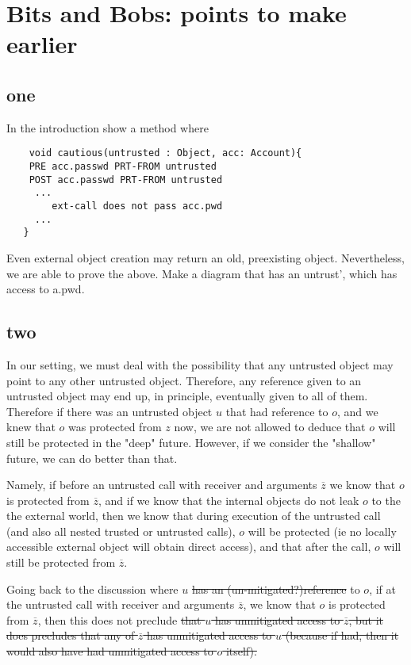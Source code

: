 

\section{Bits and Bobs: points to make earlier}

\subsection{one}
In the introduction show a method where
\begin{lstlisting}
    void cautious(untrusted : Object, acc: Account){
    PRE acc.passwd PRT-FROM untrusted
    POST acc.passwd PRT-FROM untrusted
     ...
        ext-call does not pass acc.pwd
     ...
   }
\end{lstlisting}

Even external object creation may return an old, preexisting object.
Nevertheless, we are able to prove the above. Make a diagram that has an untrust', which has access to a.pwd. 


\subsection{two}
In our setting, we must deal with the possibility  that any untrusted object may point to any other untrusted object.
Therefore, any reference given to an untrusted object may end up, in principle,  eventually given to all of them.
Therefore if there was an untrusted object $u$ that had reference to $o$,  and we knew that $o$ was protected from $z$ now, we are not
allowed   to deduce that $o$ will still be protected in the "deep" future.
However, if we consider the "shallow" future, we can do better than that.

Namely, if  before an untrusted call with receiver and arguments $\overline z$ we know that $o$ is protected from $\overline z$, and if we know that the internal objects do not leak $o$ to the the external world, then we know that during execution of the untrusted call (and also all nested trusted or untrusted calls), $o$ will be protected (ie no locally accessible external object will obtain direct access), and that after the call, $o$ will still be protected from $\overline z$.

Going back to the discussion where $u$ 
\st{has an (un-mitigated?)reference} to $o$,  if at the untrusted call
with receiver and arguments $\overline z$, we know that $o$ is
protected from $\overline z$, then this does not preclude
\st{that $u$ has unmitigated access to $\overline z$, but it does precludes that any of  $\overline z$ has unmitigated access to $u$ (because if had, then it would also have had unmitigated access to $o$ itself).}

